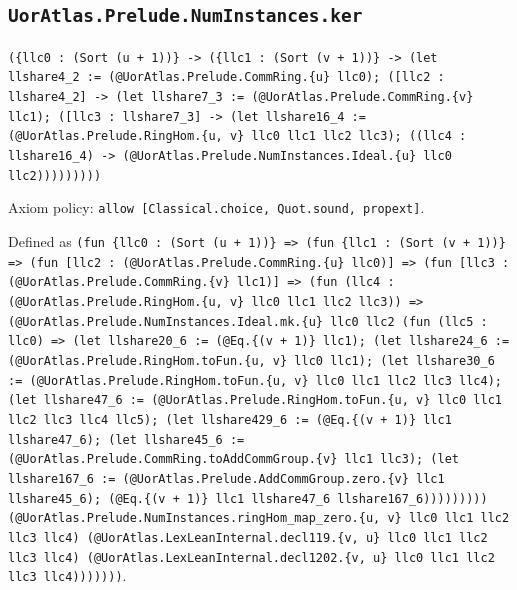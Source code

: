 \documentclass[11pt]{article}
\begin{document}
\subsection*{\texttt{UorAtlas.Prelude.NumInstances.ker}}
\noindent\texttt{(\{llc0 : (Sort (u + 1))\} -> (\{llc1 : (Sort (v + 1))\} -> (let llshare4\_2 := (@UorAtlas.Prelude.CommRing.\{u\} llc0); ([llc2 : llshare4\_2] -> (let llshare7\_3 := (@UorAtlas.Prelude.CommRing.\{v\} llc1); ([llc3 : llshare7\_3] -> (let llshare16\_4 := (@UorAtlas.Prelude.RingHom.\{u, v\} llc0 llc1 llc2 llc3); ((llc4 : llshare16\_4) -> (@UorAtlas.Prelude.NumInstances.Ideal.\{u\} llc0 llc2)))))))))}\par
\noindent Axiom policy: \texttt{allow [Classical.choice, Quot.sound, propext]}.\par
\noindent Defined as \texttt{(fun \{llc0 : (Sort (u + 1))\} => (fun \{llc1 : (Sort (v + 1))\} => (fun [llc2 : (@UorAtlas.Prelude.CommRing.\{u\} llc0)] => (fun [llc3 : (@UorAtlas.Prelude.CommRing.\{v\} llc1)] => (fun (llc4 : (@UorAtlas.Prelude.RingHom.\{u, v\} llc0 llc1 llc2 llc3)) => (@UorAtlas.Prelude.NumInstances.Ideal.mk.\{u\} llc0 llc2 (fun (llc5 : llc0) => (let llshare20\_6 := (@Eq.\{(v + 1)\} llc1); (let llshare24\_6 := (@UorAtlas.Prelude.RingHom.toFun.\{u, v\} llc0 llc1); (let llshare30\_6 := (@UorAtlas.Prelude.RingHom.toFun.\{u, v\} llc0 llc1 llc2 llc3 llc4); (let llshare47\_6 := (@UorAtlas.Prelude.RingHom.toFun.\{u, v\} llc0 llc1 llc2 llc3 llc4 llc5); (let llshare429\_6 := (@Eq.\{(v + 1)\} llc1 llshare47\_6); (let llshare45\_6 := (@UorAtlas.Prelude.CommRing.toAddCommGroup.\{v\} llc1 llc3); (let llshare167\_6 := (@UorAtlas.Prelude.AddCommGroup.zero.\{v\} llc1 llshare45\_6); (@Eq.\{(v + 1)\} llc1 llshare47\_6 llshare167\_6))))))))) (@UorAtlas.Prelude.NumInstances.ringHom\_map\_zero.\{u, v\} llc0 llc1 llc2 llc3 llc4) (@UorAtlas.LexLeanInternal.decl119.\{v, u\} llc0 llc1 llc2 llc3 llc4) (@UorAtlas.LexLeanInternal.decl1202.\{v, u\} llc0 llc1 llc2 llc3 llc4)))))))}.\par
\end{document}

